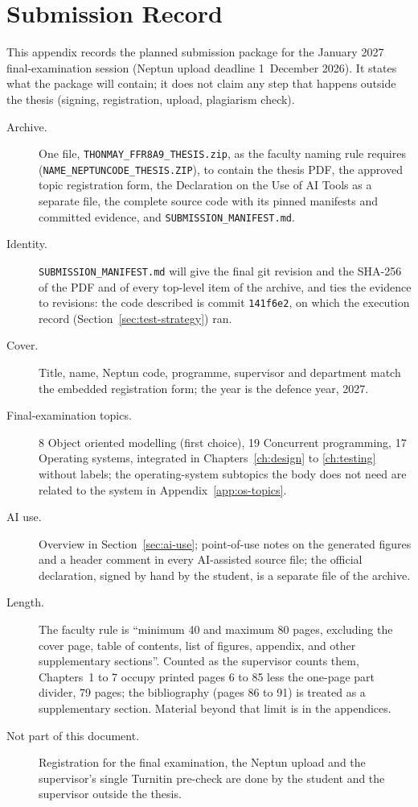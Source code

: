 \chapter{Submission Record}
\label{app:declarations}

This appendix records the planned submission package for the January 2027
final-examination session (Neptun upload deadline 1~December 2026). It states
what the package will contain; it does not claim any step that happens outside
the thesis (signing, registration, upload, plagiarism check).

\begin{description}
  \item[Archive.] One file, \texttt{THONMAY\_FFR8A9\_THESIS.zip}, as the faculty
  naming rule requires (\texttt{NAME\_NEPTUNCODE\_THESIS.ZIP}), to contain the
  thesis PDF, the approved topic registration form, the Declaration on the Use
  of AI Tools as a separate file, the complete source code with its pinned
  manifests and committed evidence, and \texttt{SUBMISSION\_MANIFEST.md}.
  \item[Identity.] \texttt{SUBMISSION\_MANIFEST.md} will give the final git
  revision and the SHA-256 of the PDF and of every top-level item of the archive,
  and ties the evidence to revisions: the code described is commit \texttt{141f6e2},
  on which the execution record (Section~\ref{sec:test-strategy}) ran.
  \item[Cover.] Title, name, Neptun code, programme, supervisor and department
  match the embedded registration form; the year is the defence year, 2027.
  \item[Final-examination topics.] 8 Object oriented modelling (first choice),
  19 Concurrent programming, 17 Operating systems, integrated in
  Chapters~\ref{ch:design} to \ref{ch:testing} without labels; the operating-system
  subtopics the body does not need are related to the system in
  Appendix~\ref{app:os-topics}.
  \item[AI use.] Overview in Section~\ref{sec:ai-use}; point-of-use notes on the
  generated figures and a header comment in every AI-assisted source file; the
  official declaration, signed by hand by the student, is a separate file of the
  archive.
  \item[Length.] The faculty rule is ``minimum 40 and maximum 80 pages,
  excluding the cover page, table of contents, list of figures, appendix, and
  other supplementary sections''. Counted as the supervisor counts them,
  Chapters~1 to 7 occupy printed pages 6 to 85 less the one-page part divider,
  79 pages; the bibliography (pages 86 to 91) is treated as a supplementary
  section. Material beyond that limit is in the appendices.
  \item[Not part of this document.] Registration for the final examination, the
  Neptun upload and the supervisor's single Turnitin pre-check are done by the
  student and the supervisor outside the thesis.
\end{description}
